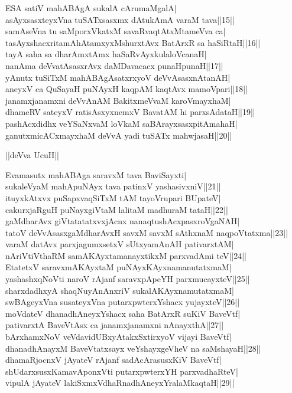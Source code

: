 \documentclass{article}
\begin{document}
ESA satiV mahABAgA sukalA cArumaMgalA|\\
asAyxsasxteyxVna tuSATxsasxmx dAtukAmA varaM tava||15||\\
samAseVna tu saMporxVkatxM savaRvaqtAtxMtameVva ca|\\
tasAyxshacxritamAhAtamxyxMshurxtAvx BatArxR sa haSiRtaH||16||\\
tayA saha sa dharAmxtAmx haSaRvAyxkulaloVcanaH|\\
nanAma deVvatAsasxrAvx daMDavacacx punaHpunaH||17||\\
yAnutx tuSiTxM mahABAgAsatxrxyoV deVvAsasxnAtanAH|\\
aneyxV ca QuSayaH puNAyxH kaqpAM kaqtAvx mamoVpari||18||\\
janamxjanamxni deVvAnAM BakitxmeVvaM karoVmayxhaM|\\
dhameRV sateyxV ratisAsxyxnemxV BavatAM hi parxsAdataH||19||\\
pashAcxdidhx veYSaNxvaM loVkaM saBArayxsasxpitAmahaH|\\
ganutxmicACxmayxhaM deVvA yadi tuSATx mahwjasaH||20||\\

\begin{center}
||deVva UcuH||
\end{center}

Evamasutx mahABAga saravxM tava BaviSayxti|\\
sukaleVyaM mahApuNAyx tava patinxV yashasivxniV||21||\\
ituyxkAtxvx puSapxvaqSiTxM tAM tayoVrupari BUpateV|\\
cakurxjaRguH puNayxgiVtaM lalitaM madhuraM tataH||22||\\
gaMdharAvx giVtatatatxvxjAcnx nanaqtushAcxpasxroVgaNAH|\\
tatoV deVvAsasxgaMdharAvxH savxM savxM sAthxnaM naqpoVtatxma||23||\\
varaM datAvx parxjagumxsetxV sUtxyamAnAH pativarxtAM|\\
nAriVtiVthaRM samAKAyxtamanayxtikxM parxvadAmi teV||24||\\
EtatetxV saravxmAKAyxtaM puNAyxKAyxnamanutatxmaM|\\
yashashxqNoVti naroV rAjanf saravxpApeYH parxmucayxteV||25||\\
sharxdadhxyA shaqNuyAnAnxriV sukalAKAyxnamutatxmaM|\\
swBAgeyxVna susateyxVna putarxpwterxYshacx yujayxteV||26||\\
moVdateV dhanadhAneyxYshacx saha BatArxR suKiV BaveVtf|\\
pativarxtA BaveVtAsx ca janamxjanamxni nAnayxthA||27||\\
bArxhamxNoV veVdavidUBxyAtakxSxtirxyoV vijayi BaveVtf|\\
dhanadhAnayxM BaveVtatxsayx veYshayxgeVheV na saMshayaH||28||\\
dhamaRjocnxV jAyateV rAjanf sadAcArasusxKiV BaveVtf|\\
shUdarxsusxKamavAponxVti putarxpwterxYH parxvadhaRteV|\\
vipulA jAyateV lakiSxmxVdhaRnadhAneyxYralaMkaqtaH||29||
\end{document}
